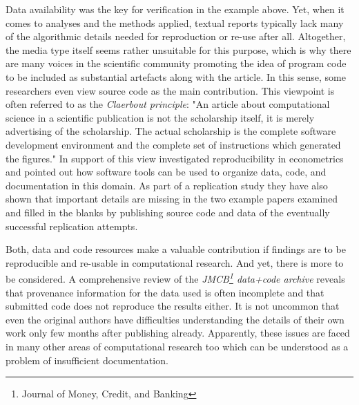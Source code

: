 \documentclass{acm_proc_article-sp}
\begin{document}
Data availability was the key for verification in the example above.
Yet, when it comes to analyses and the methods applied, textual reports typically lack many of the algorithmic details needed for reproduction or re-use after all.
Altogether, the media type itself seems rather unsuitable for this purpose, which is why there are many voices in the scientific community promoting the idea of program code to be included as substantial artefacts along with the article.
In this sense, some researchers even view source code as the main contribution.
This viewpoint is often referred to as the \textit{Claerbout principle}:
"An article about computational science in a scientific publication is not the scholarship itself, it is merely advertising of  the scholarship. The actual scholarship is the complete software development environment and the complete set of instructions which generated the figures."
\cite{Buckheit1995b}
\cite{de2001reproducible}
In support of this view \cite{KoenkerZeileis2009} investigated reproducibility in econometrics and pointed out how software tools can be used to organize data, code, and documentation in this domain.
As part of a replication study they have also shown that important details are missing in the two example papers examined and filled in the blanks by publishing source code and data of the eventually successful replication attempts.

Both, data and code resources make a valuable contribution if findings are to be reproducible and re-usable in computational research.
And yet, there is more to be considered.
A comprehensive review of the \textit{JMCB\footnote{Journal of Money, Credit, and Banking} data+code archive} reveals that provenance information for the data used is often incomplete and that submitted code does not reproduce the results either.
It is not uncommon that even the original authors have difficulties understanding the details of their own work only few months after publishing already.
Apparently, these issues are faced in many other areas of computational research too
\cite{hothorn2011case}
\cite{gonzalez2012reproducibility}
\cite{vandewalle2009reproducible}
\cite{cassey2006reproducibility}
which can be understood as a problem of insufficient documentation.
\end{document}
